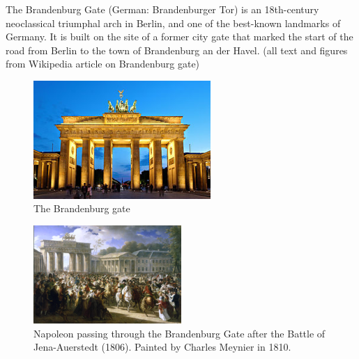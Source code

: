 \documentclass{article}
\begin{document}
The Brandenburg Gate (German: Brandenburger Tor) is an 18th-century neoclassical triumphal arch in Berlin, and one of the best-known landmarks of Germany. It is built on the site of a former city gate that marked the start of the road from Berlin to the town of Brandenburg an der Havel.
(all text and figures from Wikipedia article on Brandenburg gate)

\begin{figure}
\includegraphics[width=0.6\textwidth]{Brandenburger_Tor_abends_from_wikipedia}

\caption{The Brandenburg gate}
\end{figure}

\begin{figure} 
\includegraphics[width=0.5\textwidth]{270px-Charles_Meynier_-_Napoleon_in_Berlin}

\caption{Napoleon passing through the Brandenburg Gate after the Battle of Jena-Auerstedt (1806). Painted by Charles Meynier in 1810.}
\end{figure}
\end{document}
